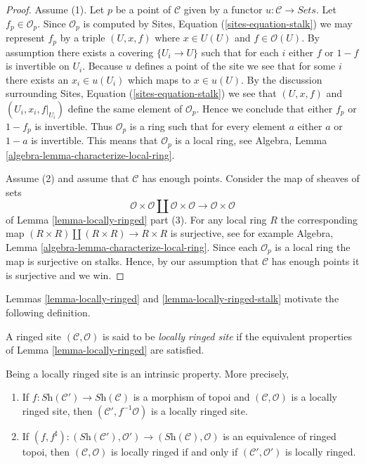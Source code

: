 \begin{proof}
Assume (1). Let $p$ be a point of $\mathcal{C}$ given by a functor
$u : \mathcal{C} \to \textit{Sets}$. Let
$f_p \in \mathcal{O}_p$. Since $\mathcal{O}_p$ is computed by
Sites, Equation (\ref{sites-equation-stalk})
we may represent $f_p$ by a triple
$(U, x, f)$ where $x \in U(U)$ and $f \in \mathcal{O}(U)$.
By assumption there exists a covering $\{U_i \to U\}$
such that for each $i$ either $f$ or $1 - f$ is invertible
on $U_i$. Because $u$ defines a point of the site we see that
for some $i$ there exists an $x_i \in u(U_i)$ which maps to
$x \in u(U)$. By the discussion surrounding
Sites, Equation (\ref{sites-equation-stalk})
we see that $(U, x, f)$ and $(U_i, x_i, f|_{U_i})$ define the
same element of $\mathcal{O}_p$. Hence we conclude that
either $f_p$ or $1 - f_p$ is invertible. Thus
$\mathcal{O}_p$ is a ring such that for every element $a$
either $a$ or $1 - a$ is invertible. This means that $\mathcal{O}_p$
is a local ring, see
Algebra, Lemma \ref{algebra-lemma-characterize-local-ring}.

\medskip\noindent
Assume (2) and assume that $\mathcal{C}$ has enough points.
Consider the map of sheaves of sets
$$
\mathcal{O} \times \mathcal{O} \amalg \mathcal{O} \times \mathcal{O}
\longrightarrow
\mathcal{O} \times \mathcal{O}
$$
of
Lemma \ref{lemma-locally-ringed} part (3). For any local ring $R$
the corresponding map
$(R \times R) \amalg (R \times R) \to R \times R$
is surjective, see for example
Algebra, Lemma \ref{algebra-lemma-characterize-local-ring}.
Since each $\mathcal{O}_p$ is a local ring the map is
surjective on stalks. Hence, by our assumption that $\mathcal{C}$
has enough points it is surjective and we win.
\end{proof}

\noindent
Lemmas \ref{lemma-locally-ringed} and
\ref{lemma-locally-ringed-stalk}
motivate the following definition.

\begin{definition}
\label{definition-locally-ringed}
A ringed site $(\mathcal{C}, \mathcal{O})$ is said to be
{\it locally ringed site} if the equivalent properties of
Lemma \ref{lemma-locally-ringed} are satisfied.
\end{definition}

\begin{lemma}
\label{lemma-locally-ringed-intrinsic}
Being a locally ringed site is an intrinsic property.
More precisely,
\begin{enumerate}
\item If $f : \textit{Sh}(\mathcal{C}') \to \textit{Sh}(\mathcal{C})$
is a morphism of topoi and $(\mathcal{C}, \mathcal{O})$ is
a locally ringed site, then $(\mathcal{C}', f^{-1}\mathcal{O})$
is a locally ringed site.
\item If
$(f, f^\sharp) : (\textit{Sh}(\mathcal{C}'), \mathcal{O}')
\to (\textit{Sh}(\mathcal{C}), \mathcal{O})$
is an equivalence of ringed topoi, then
$(\mathcal{C}, \mathcal{O})$ is locally ringed if and only if
$(\mathcal{C}', \mathcal{O}')$
is locally ringed.
\end{enumerate}
\end{lemma}

